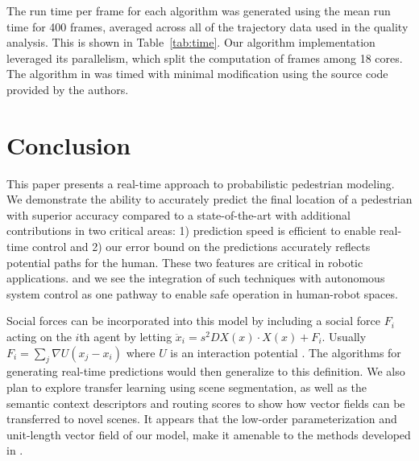 \documentclass[letterpaper,10pt,conference]{ieeeconf}
\begin{document}
The run time per frame for each algorithm was generated using the mean run time for 400 frames, averaged across all of the trajectory data used in the quality analysis.
This is shown in Table~\ref{tab:time}. 
Our algorithm implementation leveraged its parallelism, which split the computation of frames among 18 cores. 
The algorithm in \cite{Kitani2012} was timed with minimal modification using the source code provided by the authors. 


\section{Conclusion} 
\label{sec:conclusion}
This paper presents a real-time approach to probabilistic pedestrian modeling. 
We demonstrate the ability to accurately predict the final location of a pedestrian with superior accuracy compared to a state-of-the-art with additional contributions in two critical areas: 1) prediction speed is efficient to enable real-time control and 2) our error bound on the predictions accurately reflects potential paths for the human. 
These two features are critical in robotic applications. %
and we see the integration of such techniques with autonomous system control as one pathway to enable safe operation in human-robot spaces. 

Social forces can be incorporated into this model by
	including a social force $F_{i}$ acting on the $i$th agent by letting $\ddot{x}_i = s^2 DX(x) \cdot X(x) + F_i$.  
	Usually $F_{i} = \sum_{j} \nabla U( x_j - x_i)$ where $U$ is an interaction potential \cite{Helbing1995}. 
	The algorithms for generating real-time predictions would then generalize to this definition.
We also plan to explore transfer learning using scene segmentation, as well as the semantic context descriptors and routing scores to show how vector fields can be transferred to novel scenes. It appears that the low-order parameterization and unit-length vector field of our model, make it amenable to the methods developed in \cite{Ballan2016}.
\end{document}
